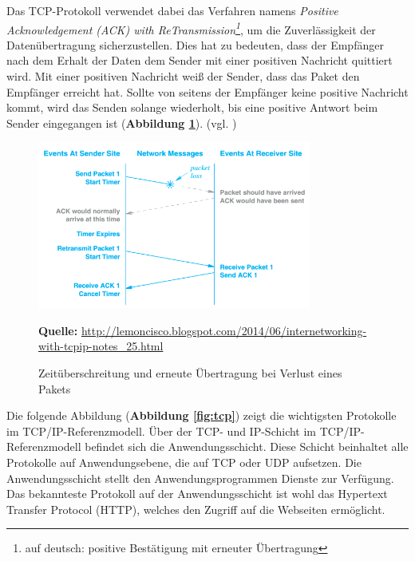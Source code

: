 Das TCP-Protokoll verwendet dabei das Verfahren namens \textit{Positive Acknowledgement (ACK) with ReTransmission\footnote{auf deutsch: positive Bestätigung mit erneuter Übertragung}}, um die Zuverlässigkeit der Datenübertragung sicherzustellen. Dies hat zu bedeuten, dass der Empfänger nach dem Erhalt der Daten dem Sender mit einer positiven Nachricht quittiert wird. Mit einer positiven Nachricht weiß der Sender, dass das Paket den Empfänger erreicht hat. Sollte von seitens der Empfänger keine positive Nachricht kommt, wird das Senden solange wiederholt, bis eine positive Antwort beim Sender eingegangen ist (\textbf {Abbildung \ref{fig:acknowledgement}}). (vgl. \cite{Hol2001})

\begin{figure}[H]
  \begin{center}
    \includegraphics[width=9cm]{img/Acknowledgement.png}
	\caption{Zeitüberschreitung und erneute Übertragung bei Verlust eines Pakets}
	\footnotesize\sffamily\textbf{Quelle:} \url{http://lemoncisco.blogspot.com/2014/06/internetworking-with-tcpip-notes_25.html} 
	\label{fig:acknowledgement}
  \end{center}   
\end{figure}

Die folgende Abbildung (\textbf {Abbildung \ref{fig:tcp}}) zeigt die wichtigsten Protokolle im TCP/IP-Referenzmodell. Über der TCP- und IP-Schicht im TCP/IP-Referenzmodell befindet sich die Anwendungsschicht. Diese Schicht beinhaltet alle Protokolle auf Anwendungsebene, die auf TCP oder UDP aufsetzen. Die Anwendungsschicht stellt den Anwendungsprogrammen Dienste zur Verfügung. Das bekannteste Protokoll auf der Anwendungsschicht ist wohl das Hypertext Transfer Protocol (HTTP), welches den Zugriff auf die Webseiten ermöglicht.

